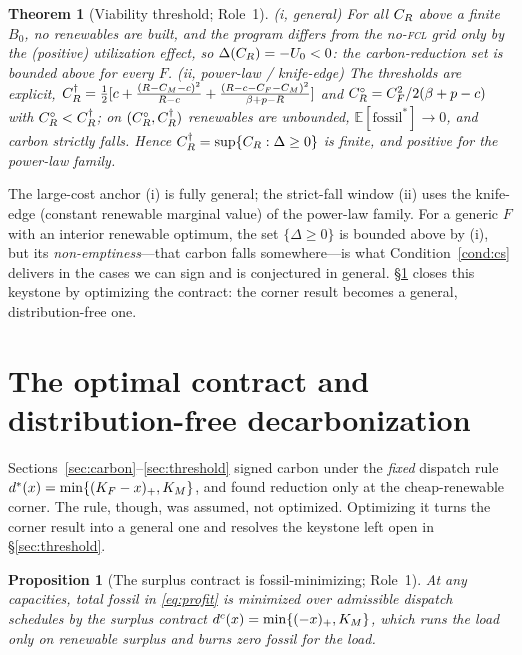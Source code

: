 \documentclass[11pt,reqno]{amsart}
\theoremstyle{plain}
\newtheorem{theorem}{Theorem}\newtheorem{proposition}{Proposition}
\theoremstyle{definition}\newtheorem{condition}{Condition}\newtheorem{assumption}{Assumption}
\theoremstyle{remark}\newtheorem{remark}{Remark}
\newcommand{\E}{\mathbb{E}}\newcommand{\PP}{\mathbb{P}}\newcommand{\eqdef}{\vcentcolon=}
\begin{document}
\begin{theorem}[Viability threshold; Role~1]\label{thm:threshold}
\textup{(i, general)} For all $C_R$ above a finite $B_0$, no renewables are built,
and the program differs from the no-\textsc{fcl} grid only by the (positive)
utilization effect, so $\Delta(C_R)=-U_0<0$: the carbon-reduction set is bounded
above for every $F$. \textup{(ii, power-law / knife-edge)} The thresholds are
explicit,
$C_R^{\dagger}=\tfrac12[c+\tfrac{(R-C_M-c)^2}{R-c}+\tfrac{(R-c-C_F-C_M)^2}{\beta+p-R}]$
and $C_R^{\circ}=C_F^2/2(\beta+p-c)$ with $C_R^{\circ}<C_R^{\dagger}$; on
$(C_R^{\circ},C_R^{\dagger})$ renewables are unbounded, $\E[\text{fossil}^{*}]\to0$,
and carbon strictly falls. Hence $C_R^{\dagger}=\sup\{C_R:\Delta\ge0\}$ is finite,
and positive for the power-law family.
\end{theorem}

The large-cost anchor (i) is fully general; the strict-fall window (ii) uses the
knife-edge (constant renewable marginal value) of the power-law family. For a
generic $F$ with an interior renewable optimum, the set $\{\Delta\ge0\}$ is bounded
above by (i), but its \emph{non-emptiness}---that carbon falls somewhere---is what
Condition~\ref{cond:cs} delivers in the cases we can sign and is conjectured in
general. \S\ref{sec:optcontract} closes this keystone by optimizing the contract:
the corner result becomes a general, distribution-free one.

\section{The optimal contract and distribution-free decarbonization}\label{sec:optcontract}

Sections~\ref{sec:carbon}--\ref{sec:threshold} signed carbon under the \emph{fixed}
dispatch rule $d^{*}(x)=\min\{(K_F-x)_+,K_M\}$, and found reduction only at the
cheap-renewable corner. The rule, though, was assumed, not optimized. Optimizing it
turns the corner result into a general one and resolves the keystone left open in
\S\ref{sec:threshold}.

\begin{proposition}[The surplus contract is fossil-minimizing; Role~1]\label{prop:surplus}
At any capacities, total fossil in \eqref{eq:profit} is minimized over admissible
dispatch schedules by the \emph{surplus contract} $d^{c}(x)=\min\{(-x)_+,K_M\}$, which
runs the load only on renewable surplus and burns \emph{zero} fossil for the load.
\end{proposition}
\end{document}
